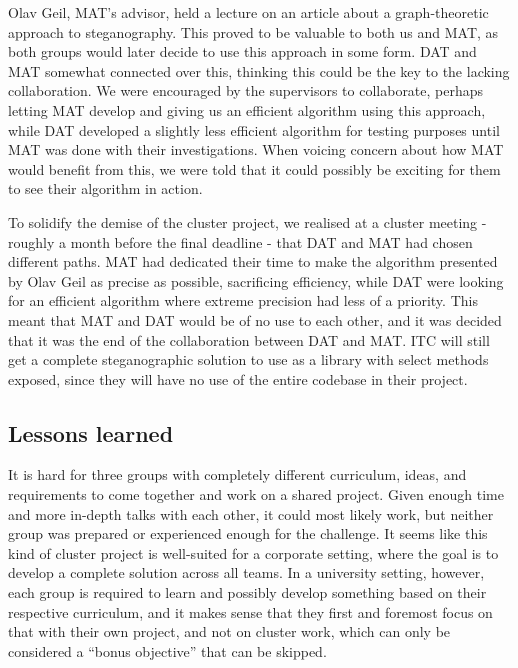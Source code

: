 Olav Geil, MAT's advisor, held a lecture on an article about a graph-theoretic approach to steganography.
This proved to be valuable to both us and MAT, as both groups would later decide to use this approach in some form.
DAT and MAT somewhat connected over this, thinking this could be the key to the lacking collaboration.
We were encouraged by the supervisors to collaborate, perhaps letting MAT develop and giving us an efficient algorithm using this approach, while DAT developed a slightly less efficient algorithm for testing purposes until MAT was done with their investigations.
When voicing concern about how MAT would benefit from this, we were told that it could possibly be exciting for them to see their algorithm in action.

To solidify the demise of the cluster project, we realised at a cluster meeting - roughly a month before the final deadline - that DAT and MAT had chosen different paths.
MAT had dedicated their time to make the algorithm presented by Olav Geil as precise as possible, sacrificing efficiency, while DAT were looking for an efficient algorithm where extreme precision had less of a priority.
This meant that MAT and DAT would be of no use to each other, and it was decided that it was the end of the collaboration between DAT and MAT.
ITC will still get a complete steganographic solution to use as a library with select methods exposed, since they will have no use of the entire codebase in their project.

\subsection*{Lessons learned}
It is hard for three groups with completely different curriculum, ideas, and requirements to come together and work on a shared project.
Given enough time and more in-depth talks with each other, it could most likely work, but neither group was prepared or experienced enough for the challenge.
It seems like this kind of cluster project is well-suited for a corporate setting, where the goal is to develop a complete solution across all teams.
In a university setting, however, each group is required to learn and possibly develop something based on their respective curriculum, and it makes sense that they first and foremost focus on that with their own project, and not on cluster work, which can only be considered a ``bonus objective'' that can be skipped.

